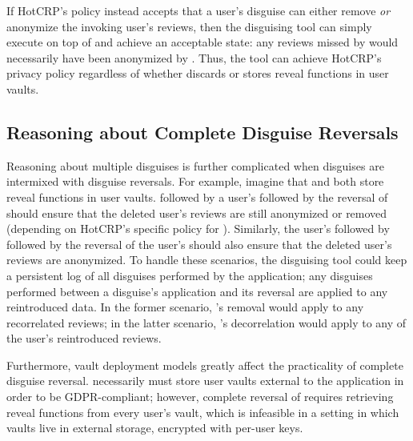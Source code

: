 If HotCRP's policy instead accepts that a user's \gdpr disguise can either remove \emph{or} anonymize the
invoking user's reviews, then the disguising tool can simply execute \gdpr on top of \ca and achieve
an acceptable state: any reviews missed by \gdpr would necessarily have been anonymized by \ca.
Thus, the tool can achieve HotCRP's privacy policy regardless of whether \ca discards or stores
reveal functions in user vaults.

\subsection{Reasoning about Complete Disguise Reversals}
Reasoning about multiple disguises is further complicated when disguises are intermixed with
disguise reversals.
%
For example, imagine that \ca and \gdpr both store reveal functions in user vaults. 
%
\ca followed by a user's \gdpr followed by the reversal of \ca should ensure that the deleted user's
reviews are still anonymized or removed (depending on HotCRP's specific policy for \gdpr).
Similarly, the user's \gdpr followed by \ca followed by the reversal of the user's \gdpr should also
ensure that the deleted user's reviews are anonymized.
To handle these scenarios, the disguising tool could keep a persistent log of all disguises performed by the
application; any disguises performed between a disguise's application and its reversal are 
applied to any reintroduced data. In the former scenario, \gdpr's removal would apply to any
recorrelated reviews; in the latter scenario, \ca's decorrelation would apply to any of the user's reintroduced reviews.

Furthermore, vault deployment models greatly affect the practicality of complete disguise reversal. \gdpr
necessarily must store user vaults external to the application in order to be GDPR-compliant;
however, complete reversal of \ca requires retrieving reveal functions from every user's vault,
which is infeasible in a setting in which vaults live in external storage, encrypted with per-user keys.
